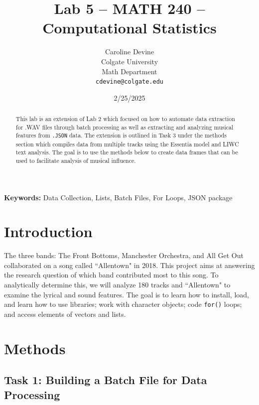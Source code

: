 \documentclass{article}\usepackage[]{graphicx}\usepackage[]{xcolor}
\begin{document}
\vspace{-1in}
\title{Lab 5 -- MATH 240 -- Computational Statistics}

\author{
  Caroline Devine \\
  Colgate University  \\
  Math Department  \\
  {\tt cdevine@colgate.edu}
}

\date{2/25/2025}

\maketitle

\begin{multicols}{2}
\begin{abstract}
This lab is an extension of Lab 2 which focused on how to automate data extraction for .WAV files through batch processing as well as extracting and analyzing musical features from \texttt{.JSON} data. The extension is outlined in Task 3 under the methods section which compiles data from multiple tracks using the Essentia model and LIWC text analysis. The goal is to use the methods below to create data frames that can be used to facilitate analysis of musical influence.
\end{abstract}

\noindent \textbf{Keywords:} Data Collection, Lists, Batch Files, For Loops, JSON package

\section{Introduction}
The three bands: The Front Bottoms, Manchester Orchestra, and All Get Out collaborated on a song called ``Allentown"\citep{Ross} in 2018. This project aims at answering the research question of which band contributed most to this song. To analytically determine this, we will analyze 180 tracks and ``Allentown" to examine the lyrical and sound features. The goal is to learn how to install, load, and learn how to use libraries; work with character objects; code \texttt{for()} loops; and access elements of vectors and lists.

\section{Methods}


\subsection{Task 1: Building a Batch File for Data Processing}


\end{multicols}
\end{document}
